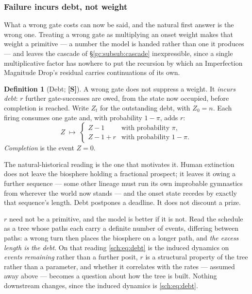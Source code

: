 \documentclass[11pt]{article}
\numberwithin{equation}{section}
\theoremstyle{plain}
\theoremstyle{definition}
\newtheorem{definition}[theorem]{Definition}
\theoremstyle{remark}
\begin{document}
\subsubsection{Failure incurs debt, not weight}\label{sch:subsub:debt}

What a wrong gate costs can now be said, and the natural first answer is
the wrong one. Treating a wrong gate as multiplying an onset weight
makes that weight a primitive --- a number the model is handed rather
than one it produces --- and leaves the cascade of
\S\ref{gc:subsub:cascade} inexpressible, since a single multiplicative
factor has nowhere to put the recursion by which an Imperfection
Magnitude Drop's residual carries continuations of its own.

\begin{definition}[Debt; \textbf{[S]}]\label{sch:def:debt}
A wrong gate does not suppress a weight. It \emph{incurs debt}: $r$
further gate-successes are owed, from the state now occupied, before
completion is reached. Write $Z_t$ for the outstanding debt, with
$Z_0=n$. Each firing consumes one gate and, with probability $1-\pi$,
adds $r$:
\begin{equation}\label{sch:eq:debt}
Z\;\longmapsto\;
\begin{cases}
Z-1 & \text{with probability }\pi,\\
Z-1+r & \text{with probability }1-\pi .
\end{cases}
\end{equation}
\emph{Completion} is the event $Z=0$.
\end{definition}

The natural-historical reading is the one that motivates it. Human
extinction does not leave the biosphere holding a fractional prospect;
it leaves it owing a further sequence --- some other lineage must run
its own improbable gymnastics from wherever the world now stands --- and
the onset state recedes by exactly that sequence's length. Debt
postpones a deadline. It does not discount a prize.

$r$ need not be a primitive, and the model is better if it is not. Read
the schedule as a tree whose paths each carry a definite number of
events, differing between paths: a wrong turn then places the biosphere
on a longer path, and \emph{the excess length is the debt}. On that
reading \eqref{sch:eq:debt} is the induced dynamics on \emph{events
remaining} rather than a further posit, $r$ is a structural property of
the tree rather than a parameter, and whether it correlates with the
rates --- assumed away above --- becomes a question about how the tree
is built. Nothing downstream changes, since the induced dynamics is
\eqref{sch:eq:debt}.
\end{document}
